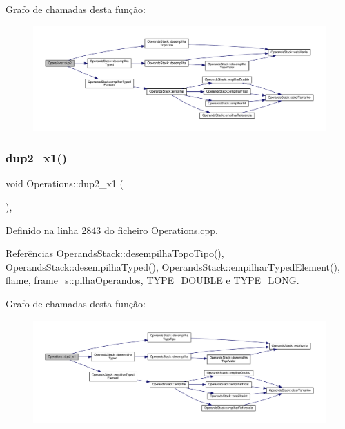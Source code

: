 Grafo de chamadas desta função\+:
\nopagebreak
\begin{figure}[H]
\begin{center}
\leavevmode
\includegraphics[width=350pt]{classOperations_a7cb6985281b1ab32e905e4726ef2c964_cgraph}
\end{center}
\end{figure}
\mbox{\label{classOperations_a57b0cf4d7a133bf35b39fcf8d6e15511}} 
\subsubsection{\texorpdfstring{dup2\+\_\+x1()}{dup2\_x1()}}
{\footnotesize\ttfamily void Operations\+::dup2\+\_\+x1 (\begin{DoxyParamCaption}{ }\end{DoxyParamCaption})\hspace{0.3cm}{\ttfamily [static]}, {\ttfamily [private]}}



Definido na linha 2843 do ficheiro Operations.\+cpp.



Referências Operands\+Stack\+::desempilha\+Topo\+Tipo(), Operands\+Stack\+::desempilha\+Typed(), Operands\+Stack\+::empilhar\+Typed\+Element(), flame, frame\+\_\+s\+::pilha\+Operandos, T\+Y\+P\+E\+\_\+\+D\+O\+U\+B\+LE e T\+Y\+P\+E\+\_\+\+L\+O\+NG.

Grafo de chamadas desta função\+:
\nopagebreak
\begin{figure}[H]
\begin{center}
\leavevmode
\includegraphics[width=350pt]{classOperations_a57b0cf4d7a133bf35b39fcf8d6e15511_cgraph}
\end{center}
\end{figure}
\mbox{\label{classOperations_ab49247b3958376b27e8347e053dfe7de}} 

